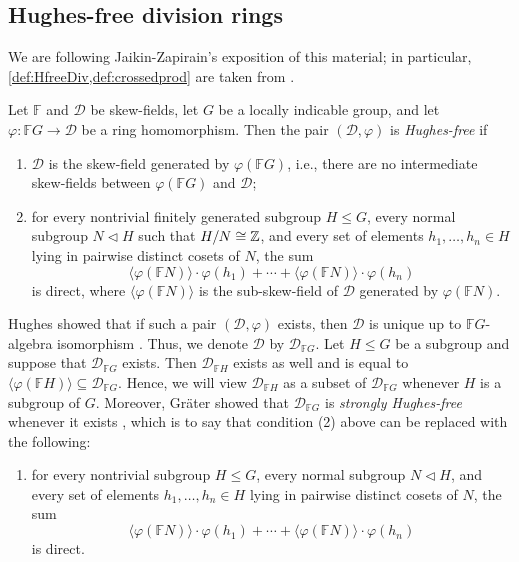 \documentclass[11pt, letterpaper]{amsart}
\begin{document}
\subsection{Hughes-free division rings}

We are following Jaikin-Zapirain's exposition of this material; in particular, \cref{def:HfreeDiv,def:crossedprod} are taken from \cite{JaikinZapirain2020THEUO}.

\begin{defn} \label{def:HfreeDiv}
Let $\mathbb{F}$ and $\mathcal{D}$ be skew-fields, let $G$ be a locally indicable group, and let $\varphi \colon \mathbb{F} G \longrightarrow \mathcal{D}$ be a ring homomorphism. Then the pair $(\mathcal{D}, \varphi)$ is \textit{Hughes-free} if
\begin{enumerate}[label=(\arabic*)]
    \item\label{item:epic} $\mathcal{D}$ is the skew-field generated by $\varphi(\mathbb{F} G)$, i.e., there are no intermediate skew-fields between $\varphi(\mathbb{F}G)$ and $\mathcal{D}$;
    \item\label{item:direct} for every nontrivial finitely generated subgroup $H \leqslant G$, every normal subgroup $N \triangleleft H$ such that $H/N \cong \mathbb{Z}$, and every set of elements $h_1, \dots, h_n \in H$  lying in pairwise distinct cosets of $N$, the sum
    \[
    \langle\varphi(\mathbb{F}N)\rangle \cdot \varphi(h_1) + \cdots + \langle\varphi(\mathbb{F}N)\rangle \cdot \varphi(h_n)
    \]
    is direct, where $\langle\varphi(\mathbb{F}N)\rangle$ is the sub-skew-field of $\mathcal{D}$ generated by $\varphi(\mathbb{F}N)$.
\end{enumerate}
\end{defn}

Hughes showed that if such a pair $(\mathcal{D},\varphi)$ exists, then $\mathcal{D}$ is unique up to $\mathbb{F}G$-algebra isomorphism \cite{HughesDivRings1970}. Thus, we denote $\mathcal{D}$ by $\mathcal{D}_{\mathbb{F}G}$. Let $H \leqslant G$ be a subgroup and suppose that $\mathcal{D}_{\mathbb{F}G}$ exists. Then $\mathcal{D}_{\mathbb{F}H}$ exists as well and is equal to $\langle \varphi(\mathbb{F}H) \rangle \subseteq \mathcal{D}_{\mathbb{F}G}$. Hence, we will view $\mathcal{D}_{\mathbb{F}H}$ as a subset of $\mathcal{D}_{\mathbb{F}G}$ whenever $H$ is a subgroup of $G$. Moreover, Gr\"ater showed that $\mathcal{D}_{\mathbb{F}G}$ is \textit{strongly Hughes-free} whenever it exists \cite[Corollary 8.3]{Grater20}, which is to say that condition (2) above can be replaced with the following:
\begin{enumerate}[label = {($2^\prime$)}]
    \item\label{item:2prime} for every nontrivial subgroup $H \leqslant G$, every normal subgroup $N \triangleleft H$, and every set of elements $h_1, \dots, h_n \in H$  lying in pairwise distinct cosets of $N$, the sum
    \[
    \langle\varphi(\mathbb{F}N)\rangle \cdot \varphi(h_1) + \cdots + \langle\varphi(\mathbb{F}N)\rangle \cdot \varphi(h_n)
    \]
    is direct.
\end{enumerate}
\end{document}
